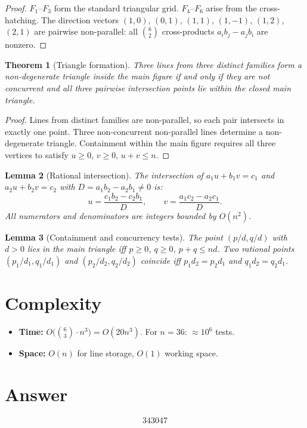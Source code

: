\documentclass[12pt]{article}
\newtheorem{theorem}{Theorem}
\newtheorem{lemma}[theorem]{Lemma}
\theoremstyle{definition}
\begin{document}
\begin{proof}
$F_1$--$F_3$ form the standard triangular grid. $F_4$--$F_6$ arise from the cross-hatching. The direction vectors $(1,0)$, $(0,1)$, $(1,1)$, $(1,-1)$, $(1,2)$, $(2,1)$ are pairwise non-parallel: all $\binom{6}{2}$ cross-products $a_i b_j - a_j b_i$ are nonzero.
\end{proof}

\begin{theorem}[Triangle formation]
Three lines from three distinct families form a non-degenerate triangle inside the main figure if and only if they are not concurrent and all three pairwise intersection points lie within the closed main triangle.
\end{theorem}

\begin{proof}
Lines from distinct families are non-parallel, so each pair intersects in exactly one point. Three non-concurrent non-parallel lines determine a non-degenerate triangle. Containment within the main figure requires all three vertices to satisfy $u \ge 0$, $v \ge 0$, $u + v \le n$.
\end{proof}

\begin{lemma}[Rational intersection]
The intersection of $a_1 u + b_1 v = c_1$ and $a_2 u + b_2 v = c_2$ with $D = a_1 b_2 - a_2 b_1 \neq 0$ is:
\[
u = \frac{c_1 b_2 - c_2 b_1}{D}, \qquad v = \frac{a_1 c_2 - a_2 c_1}{D}.
\]
All numerators and denominators are integers bounded by $O(n^2)$.
\end{lemma}

\begin{lemma}[Containment and concurrency tests]
The point $(p/d, q/d)$ with $d > 0$ lies in the main triangle iff $p \ge 0$, $q \ge 0$, $p + q \le nd$. Two rational points $(p_1/d_1, q_1/d_1)$ and $(p_2/d_2, q_2/d_2)$ coincide iff $p_1 d_2 = p_2 d_1$ and $q_1 d_2 = q_2 d_1$.
\end{lemma}

\section{Complexity}
\begin{itemize}
    \item \textbf{Time:} $O\bigl(\binom{6}{3} \cdot n^3\bigr) = O(20 n^3)$. For $n = 36$: $\approx 10^6$ tests.
    \item \textbf{Space:} $O(n)$ for line storage, $O(1)$ working space.
\end{itemize}

\section{Answer}

\[
\boxed{343047}
\]
\end{document}
